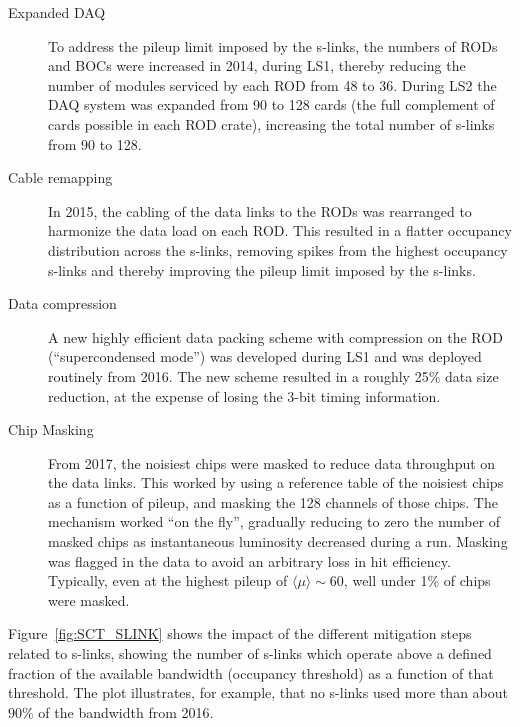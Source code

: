 \documentclass[cernpreprint, atlasdraft=false, UKenglish,british,orcidlogo, texmf, orcidlogo]{atlasdoc}
\begin{document}
 
\begin{description}
 
\item[Expanded \gls{DAQ}]
To address the pileup limit imposed by the \glspl{s-link}, the numbers of \glspl{ROD} and \glspl{BOC} were increased in 2014, during \gls{LS1}, thereby reducing the number of modules serviced by each \gls{ROD} from 48 to 36. During \gls{LS2} the \gls{DAQ} system was expanded from 90 to 128 cards (the full complement of cards possible in each \gls{ROD} crate), increasing the total number of \glspl{s-link} from 90 to 128.
 
\item[Cable remapping]
In 2015, the cabling of the data links to the \glspl{ROD} was rearranged to harmonize the data load on each \gls{ROD}. This resulted in a flatter occupancy distribution across the \glspl{s-link}, removing spikes from the highest occupancy \glspl{s-link} and thereby improving the pileup limit imposed by the \glspl{s-link}.
 
\item[Data compression]
A new highly efficient data packing scheme with compression on the \gls{ROD} (``supercondensed mode'') was developed during \gls{LS1} and was deployed routinely from 2016.  The new scheme resulted in a roughly 25\% data size reduction, at the expense of losing the 3-bit timing information.
 
\item[Chip Masking]
From 2017, the noisiest chips were masked to reduce data throughput on the data links. This worked by using a reference table of the noisiest chips as a function of pileup, and masking the \num{128} channels of those chips. The mechanism worked ``on the fly'', gradually reducing to zero the number of masked chips as instantaneous luminosity decreased during a run. Masking was flagged in the data to avoid an arbitrary loss in hit efficiency. Typically, even at the highest pileup of $\langle\mu\rangle\sim 60$, well under 1\% of chips were masked.
 
\end{description}
 
Figure~\ref{fig:SCT_SLINK} shows the impact of the different mitigation steps related to \glspl{s-link}, showing the number of \glspl{s-link} which operate above a defined fraction of the available bandwidth (occupancy threshold)
as a function of that threshold. The plot illustrates, for example, that no \glspl{s-link} used more than about $90\%$ of the bandwidth from 2016.
 
\end{document}
